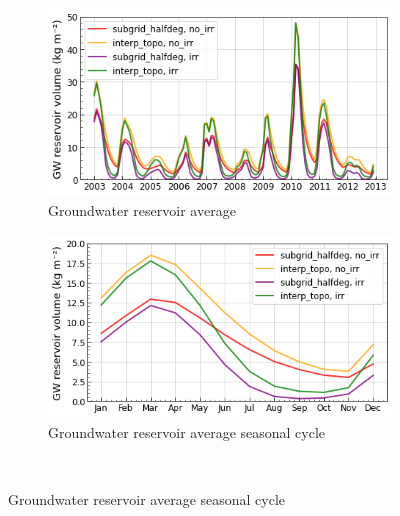 \begin{figure}[htbp]
    \centering
    \begin{subfigure}[b]{0.48\textwidth}
        \caption{Groundwater reservoir average}
        \includegraphics[width=\textwidth]{images/chap3/time_series/slowr_time_series.png}
    \end{subfigure}
        \begin{subfigure}[b]{0.48\textwidth}
        \caption{Groundwater reservoir average seasonal cycle}
        \includegraphics[width=\textwidth]{images/chap3/time_series/slowr_seasonal_cycle.png}
    \end{subfigure} \\
    

\end{figure}
